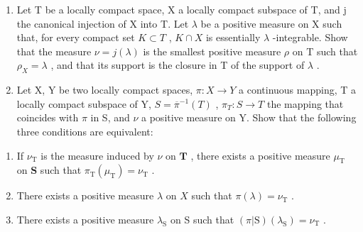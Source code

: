 \begin{enumerate}
\def\labelenumi{\arabic{enumi})}
\setcounter{enumi}{5}
\item
  Let T be a locally compact space, X a locally compact subspace of T, and j the canonical injection of X into T. Let \(\lambda\) be a positive measure on X such that, for every compact set \(K \subset T\) , \(K \cap X\) is essentially \(\lambda\) -integrable. Show that the measure \(\nu = j(\lambda)\) is the smallest positive measure \(\rho\) on T such that \(\rho_{X} = \lambda\) , and that its support is the closure in T of the support of \(\lambda\) .
\item
  Let X, Y be two locally compact spaces, \(\pi: X \to Y\) a continuous mapping, T a locally compact subspace of Y, \(S = \overline{\pi}^{-1}(T)\) , \(\pi_{T}: S \to T\) the mapping that coincides with \(\pi\) in S, and \(\nu\) a positive measure on Y. Show that the following three conditions are equivalent:
\end{enumerate}

\begin{enumerate}
\def\labelenumi{\alph{enumi})}
\item
  If \(\nu_{\mathrm{T}}\) is the measure induced by \(\nu\) on \(\mathbf{T}\) , there exists a positive measure \(\mu_{\mathrm{T}}\) on \(\mathbf{S}\) such that \(\pi_{\mathrm{T}}(\mu_{\mathrm{T}}) = \nu_{\mathrm{T}}\) .
\item
  There exists a positive measure \(\lambda\) on \(X\) such that \(\pi (\lambda) = \nu_{\mathrm{T}}\) .
\item
  There exists a positive measure \(\lambda_{\mathrm{S}}\) on S such that \((\pi|\mathrm{S})(\lambda_{\mathrm{S}})=\nu_{\mathrm{T}}\) .
\end{enumerate}

